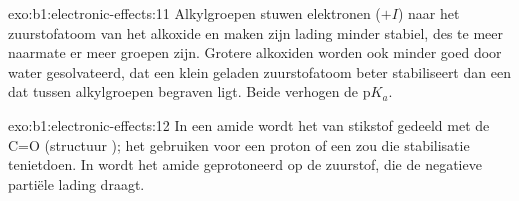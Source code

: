 \begin{solution}{exo:b1:electronic-effects:11}
Alkylgroepen stuwen elektronen ($+I$) naar het zuurstofatoom van het
alkoxide en maken zijn lading minder stabiel, des te meer naarmate er
meer groepen zijn. Grotere alkoxiden worden ook minder goed door water
gesolvateerd, dat een klein geladen zuurstofatoom beter stabiliseert dan
een dat tussen alkylgroepen begraven ligt. Beide verhogen de
$\mathrm{p}K_a$.
\end{solution}

\begin{solution}{exo:b1:electronic-effects:12}
In een amide wordt het  van stikstof gedeeld met de C=O
(structuur ); het gebruiken voor een proton of een
 zou die stabilisatie tenietdoen. In  wordt het amide
geprotoneerd op de zuurstof, die de negatieve partiële lading draagt.
\end{solution}

